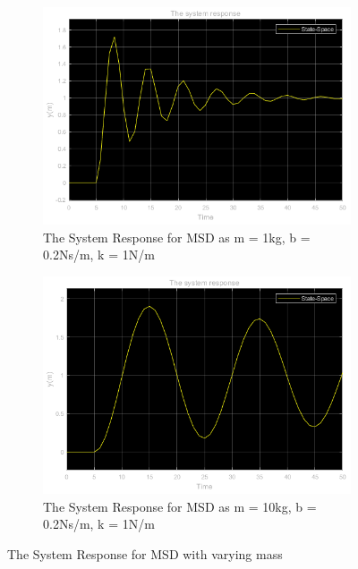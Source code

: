 \documentclass[a4paper,12pt]{article}
\begin{document}
\begin{enumerate}
\begin{enumerate}
\begin{enumerate}
				\begin{figure}[H]
					\setlength{\unitlength}{\textwidth} 
					\centering
					\begin{subfigure}{.5\textwidth}
  						\centering
  						\includegraphics[width=0.495\unitlength]{images/1cey}
  						\caption{\label{fig:1c2a} The System Response for MSD as m = 1kg, b = 0.2Ns/m, k = 1N/m }
					\end{subfigure}%
					\begin{subfigure}{.5\textwidth}
  						\centering
						\includegraphics[width=0.495\unitlength]{images/1c2ey}
  						\caption{\label{fig:1c2} The System Response for MSD as m = 10kg, b = 0.2Ns/m, k = 1N/m }
					\end{subfigure}
					\caption{\label{fig:varyingm} The System Response for MSD with varying mass   }
				\end{figure}
			

\end{enumerate}
\end{enumerate}
\end{enumerate}
\end{document}
